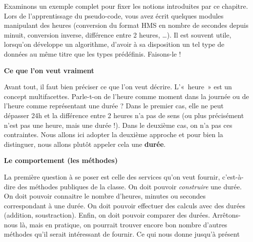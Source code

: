 Examinons un exemple complet pour fixer les notions introduites par ce
chapitre. Lors de l'apprentissage du pseudo-code, vous
avez écrit quelques modules manipulant des heures (conversion du format
HMS en nombre de secondes depuis minuit, conversion inverse, différence
entre 2 heures, …). Il est souvent utile, lorsqu’on développe un
algorithme, d’avoir à sa disposition un tel type de données au même
titre que les types prédéfinis. Faisons-le !

{\sffamily\bfseries\upshape
Ce que l’on veut vraiment}

Avant tout, il faut bien préciser ce que l’on veut décrire. L’«~heure~»
est un concept multifacettes. Parle-t-on de l’heure comme moment dans
la journée ou de l’heure comme représentant une durée ? Dans le premier
cas, elle ne peut dépasser 24h et la différence entre 2 heures n’a pas
de sens (ou plus précisément n’est pas une heure, mais une durée !).
Dans le deuxième cas, on n’a pas ces contraintes. Nous allons ici
adopter la deuxième approche et pour bien la distinguer, nous allons
plutôt appeler cela une \textbf{durée}.

{\sffamily\bfseries\upshape
Le comportement (les méthodes)}

La première question à se poser est celle des services qu’on veut
fournir, c’est-à-dire des méthodes publiques de la classe. On doit
pouvoir \textit{construire} une durée. On doit pouvoir connaitre le
nombre d’heures, minutes ou secondes correspondant à une durée. On doit
pouvoir effectuer des calculs avec des durées (addition, soustraction).
Enfin, on doit pouvoir comparer des durées. Arrêtons-nous là, mais en
pratique, on pourrait trouver encore bon nombre d’autres méthodes qu’il
serait intéressant de fournir. Ce qui nous donne jusqu’à présent


